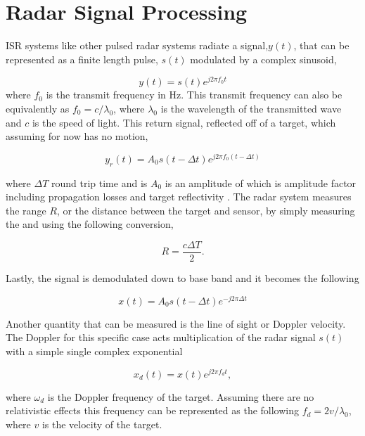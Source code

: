 \section{Radar Signal Processing}
ISR systems like other pulsed radar systems radiate a signal,$y(t)$, that can be represented as a finite length pulse, $s(t)$ modulated by a complex sinusoid,

\begin{equation}
\label{eqn:sigone}
y(t)=s(t)e^{j2\pi f_0 t}
\end{equation}
\noindent where $f_0$ is the transmit frequency in Hz. This transmit frequency can also be equivalently as $ f_0=c/\lambda_0$, where $\lambda_0$ is the wavelength of the transmitted wave and $c$ is the speed of light. This return signal, reflected off of a target, which assuming for now has no motion,

\begin{equation}
\label{eqn:sigone}
y_r(t)=A_0s(t-\Delta t)e^{j2\pi f_0 (t-\Delta t)}
\end{equation}

\noindent where $\Delta T$ round trip time and is $A_0$  is an amplitude of which is amplitude factor including propagation losses and target reflectivity \cite{richards:fundamentalsigproc}. The radar system measures the range $R$, or the distance between the target and sensor, by simply measuring the and using the following conversion,

\begin{equation}
\label{eqn:range_intro}
R=\frac{c\Delta T}{2}.
\end{equation}

\noindent Lastly, the signal is demodulated down to base band and it becomes the following

\begin{equation}
\label{eqn:baseband}
x(t)=A_0s(t-\Delta t)e^{-j2\pi\Delta t}
\end{equation}

Another quantity that can be measured is the line of sight or Doppler velocity. The Doppler for this specific case acts multiplication of the radar signal $s(t)$ with a simple single complex exponential

\begin{equation}
\label{simpledop}
x_d(t) = x(t)e^{j2\pi f_d t},
\end{equation}
 
\noindent where $\omega_d$ is the Doppler frequency of the target. Assuming there are no relativistic effects this frequency can be represented as the following $f_d = 2v/\lambda_0 $, where $v$ is the velocity of the target. 


